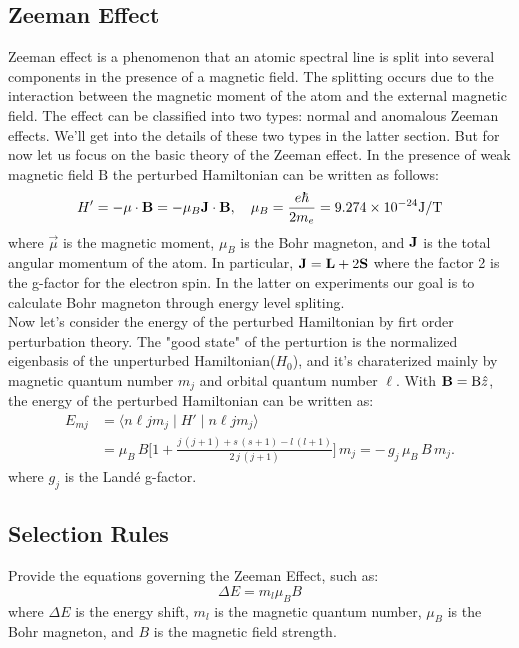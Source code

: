\documentclass[a4paper,12pt]{article}
\begin{document}
\subsection{Zeeman Effect}
Zeeman effect is a phenomenon that an atomic spectral line is split into several components in the presence of a magnetic field. The splitting occurs due to the interaction between the magnetic moment of the atom and the external magnetic field. The effect can be classified into two types: normal and anomalous Zeeman effects. We'll get into the details of these two types in the latter section. But for now let us focus on the basic theory of the Zeeman effect. In the presence of weak magnetic field $\mathrm{B}$ the perturbed Hamiltonian can be written as follows:
\begin{equation}
H' = -\bold{\mu} \cdot \bold{B} = -\mu_B \bold{J} \cdot \bold{B} , ~~~ \mu_B = \frac{e \hbar}{2 m_e} = 9.274 \times 10^{-24} \mathrm{J/T}
\end{equation}
where $\vec{\mu}$ is the magnetic moment, $\mu_B$ is the Bohr magneton, and $\bold{J}$ is the total angular momentum of the atom. In particular, $\bold{J} = \bold{L} + 2\bold{S}$ where the factor 2 is the g-factor for the electron spin. In the latter on experiments our goal is to calculate Bohr magneton through energy level spliting. \\
\indent  Now let's consider the energy of the perturbed Hamiltonian by firt order perturbation theory. The "good state" of the perturtion is the normalized eigenbasis of the unperturbed Hamiltonian($H_0$), and it's charaterized mainly by magnetic quantum number $m_j$ and orbital quantum number $\ell$. With $\bold{B} = \mathrm{B}\hat{z}$, the energy of the perturbed Hamiltonian can be written as: 
\begin{align}
    E_{mj} 
    &= \langle n \ell jm_j \mid H' \mid n\ell jm_j \rangle \\
    &= \mu_{B}\,B \biggl[
      1 + \frac{j\,(j+1) + s\,(s+1) - l\,(l+1)}{2\,j\,(j+1)}
    \biggr] \, m_{j} 
    = -\,g_j\,\mu_{B}\,B\,m_{j}.
\end{align}
where $g_j$ is the Landé g-factor.
\subsection{Selection Rules}
Provide the equations governing the Zeeman Effect, such as:
\[
\Delta E = m_l \mu_B B
\]
where \( \Delta E \) is the energy shift, \( m_l \) is the magnetic quantum number, \( \mu_B \) is the Bohr magneton, and \( B \) is the magnetic field strength.
\end{document}
